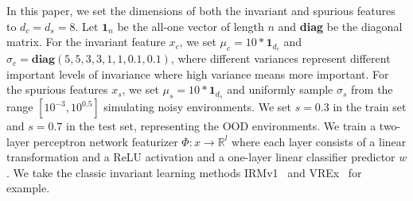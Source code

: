 In this paper, we set the dimensions of both the invariant and spurious features to $d_c = d_s = 8$. 
Let $\mathbf{1}_n$ be the all-one vector of length $n$ and \textbf{diag} be the diagonal matrix. 
For the invariant feature $x_c$, we set $\mu_c=10*\mathbf{1}_{d_c}$ and $\sigma_c=\textbf{diag}(5,5,3,3,1,1,0.1,0.1)$, where different variances represent different important levels of invariance where high variance means more important.
For the spurious features $x_s$, we set $\mu_s=10*\mathbf{1}_{d_s}$ and uniformly sample $\sigma_s$ from the range $[10^{-3}, 10^{0.5}]$ simulating noisy environments.
We set $s=0.3$ in the train set and $s=0.7$ in the test set, representing the OOD environments.
We train a two-layer perceptron network featurizer $\Phi: x \rightarrow \mathbb{R}^l$ where each layer consists of a linear transformation and a ReLU activation and a one-layer linear classifier predictor $w$.
We take the classic invariant learning methods IRMv1~\citep{irmv1} and VREx~\citep{v-rex} for example.


